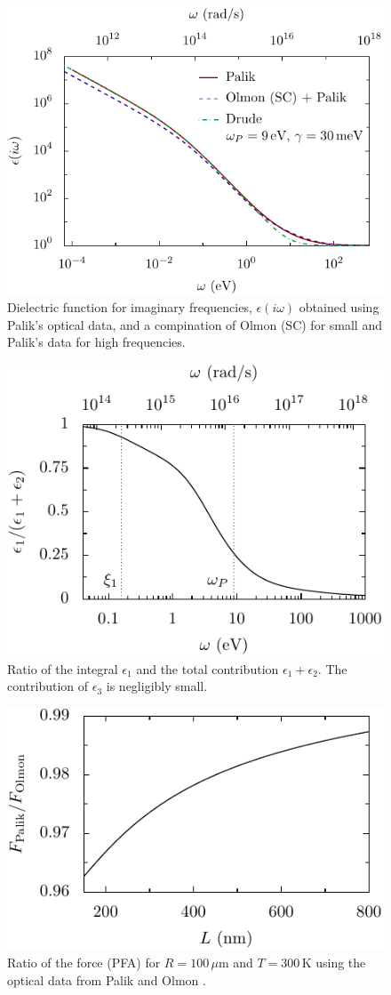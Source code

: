 \documentclass[twocolumn,superscriptaddress,pre]{revtex4-1}
\begin{document}
\begin{figure}
\includegraphics[width=0.95\columnwidth]{img/eps_imag.pdf}
\caption{Dielectric function for imaginary frequencies, $\epsilon(i\omega)$
obtained using Palik's optical data, and a compination of Olmon (SC) for small
and Palik's data for high frequencies.}
\label{fig:eps_imag}
\end{figure}

\begin{figure}
\includegraphics[width=0.7\columnwidth]{img/ratio.pdf}
\caption{Ratio of the integral $\epsilon_1$ and the total contribution $\epsilon_1+\epsilon_2$. The contribution of $\epsilon_3$ is negligibly small.}
\label{fig:ratio}
\end{figure}

\begin{figure}
\includegraphics[width=0.7\columnwidth]{img/diff.pdf}
\caption{Ratio of the force (PFA) for $R=100\,\mu$m and $T=300\,$K using the optical data from Palik \cite{Palik1995} and Olmon \cite{Olmon2012}.}
\label{fig:diff}
\end{figure}
\end{document}
